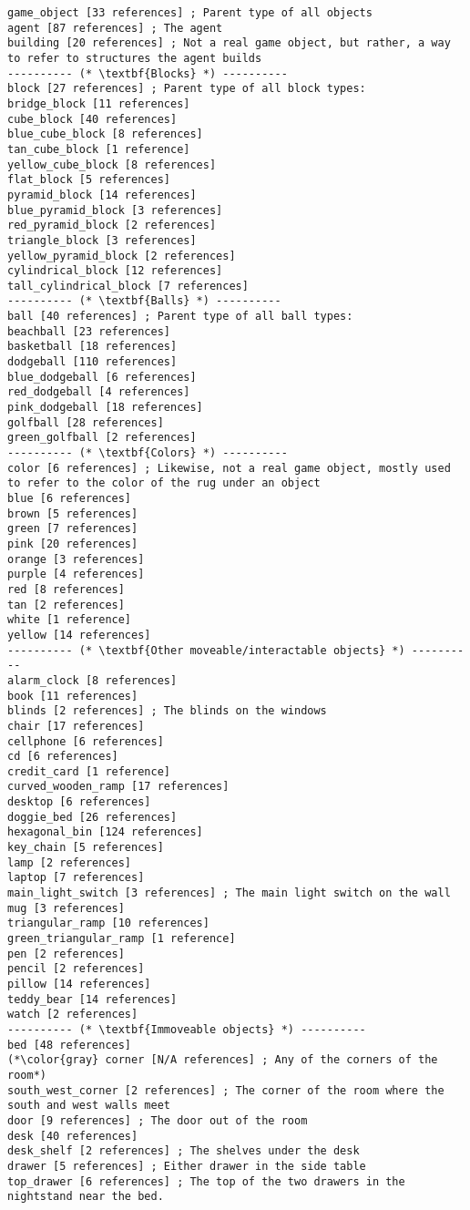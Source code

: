 \documentclass{article}
\begin{document}
\begin{lstlisting}
game_object [33 references] ; Parent type of all objects
agent [87 references] ; The agent
building [20 references] ; Not a real game object, but rather, a way to refer to structures the agent builds
---------- (* \textbf{Blocks} *) ----------
block [27 references] ; Parent type of all block types:
bridge_block [11 references]
cube_block [40 references]
blue_cube_block [8 references]
tan_cube_block [1 reference]
yellow_cube_block [8 references]
flat_block [5 references]
pyramid_block [14 references]
blue_pyramid_block [3 references]
red_pyramid_block [2 references]
triangle_block [3 references]
yellow_pyramid_block [2 references]
cylindrical_block [12 references]
tall_cylindrical_block [7 references]
---------- (* \textbf{Balls} *) ----------
ball [40 references] ; Parent type of all ball types:
beachball [23 references]
basketball [18 references]
dodgeball [110 references]
blue_dodgeball [6 references]
red_dodgeball [4 references]
pink_dodgeball [18 references]
golfball [28 references]
green_golfball [2 references]
---------- (* \textbf{Colors} *) ----------
color [6 references] ; Likewise, not a real game object, mostly used to refer to the color of the rug under an object
blue [6 references]
brown [5 references]
green [7 references]
pink [20 references]
orange [3 references]
purple [4 references]
red [8 references]
tan [2 references]
white [1 reference]
yellow [14 references]
---------- (* \textbf{Other moveable/interactable objects} *) ----------
alarm_clock [8 references]
book [11 references]
blinds [2 references] ; The blinds on the windows
chair [17 references]
cellphone [6 references]
cd [6 references]
credit_card [1 reference]
curved_wooden_ramp [17 references]
desktop [6 references]
doggie_bed [26 references]
hexagonal_bin [124 references]
key_chain [5 references]
lamp [2 references]
laptop [7 references]
main_light_switch [3 references] ; The main light switch on the wall
mug [3 references]
triangular_ramp [10 references]
green_triangular_ramp [1 reference]
pen [2 references]
pencil [2 references]
pillow [14 references]
teddy_bear [14 references]
watch [2 references]
---------- (* \textbf{Immoveable objects} *) ----------
bed [48 references]
(*\color{gray} corner [N/A references] ; Any of the corners of the room*)
south_west_corner [2 references] ; The corner of the room where the south and west walls meet
door [9 references] ; The door out of the room
desk [40 references]
desk_shelf [2 references] ; The shelves under the desk
drawer [5 references] ; Either drawer in the side table
top_drawer [6 references] ; The top of the two drawers in the nightstand near the bed.

\end{lstlisting}
\end{document}
